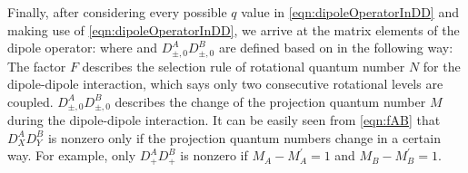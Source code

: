 Finally, after considering every possible $q$ value in \autoref{eqn:dipoleOperatorInDD} and making use of \autoref{eqn:dipoleOperatorInDD}, we arrive at the matrix elements of the dipole operator:
where
and $D^{A}_{\pm, 0}D^{B}_{\pm, 0}$ are defined based on 
 in the following way:
The factor $F$ describes the selection rule of rotational quantum number $N$ for the dipole-dipole interaction, which 
says only two consecutive rotational levels are coupled. $D^{A}_{\pm, 0}D^{B}_{\pm, 0}$ describes the change of
the projection quantum number $M$ during the dipole-dipole interaction. It can be easily seen from \autoref{eqn:fAB}
that $D^{A}_{X}D^{B}_{Y}$ is nonzero only if the projection quantum numbers change in a certain way. For example, 
only $D^{A}_{+}D^{B}_{+}$ is nonzero if $M_A - M_A^{\prime} = 1$ and $M_B - M_B^{\prime} = 1$.  

